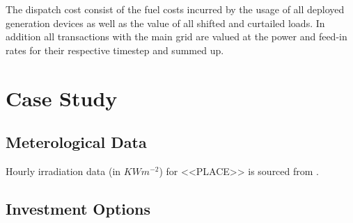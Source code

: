 \documentclass[
	11pt,								%
	DIV10,								%
	a4paper,         					%
	oneside,							%
	headheight=20pt,					%
	footheight=20pt,					%
    parskip=full,						%
    listof=totoc,						%
	bibliography=totoc,					%
	index=totoc,						%
]{scrartcl}
\begin{document}
The dispatch cost consist of the fuel costs incurred by the usage of all deployed generation devices as well as the value of all shifted and curtailed loads. In addition all transactions with the main grid are valued at the power and feed-in rates for their respective timestep and summed up.


\newpage
\section{Case Study}
\subsection{Meterological Data}
Hourly irradiation data (in $KWm^{-2}$) for <<PLACE>> is sourced from \cite{pfenningerLongtermPatternsEuropean2016}. 
\subsection{Investment Options}
\end{document}
